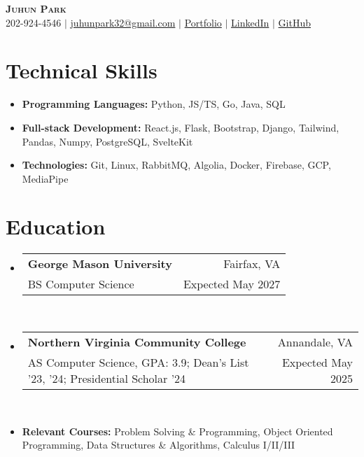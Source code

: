 \documentclass[letterpaper,11pt]{article}
\makeatletter
\newcommand{\resumeItem}[1]{
  \item\small{
    {#1 \vspace{0pt}}
  }
}
\newcommand{\resumeItemThin}[1]{
  \item\small{
    {#1 \vspace{-5pt}}
  }
}
\newcommand{\resumeSubheading}[4]{
    \item
    \begin{tabular*}{0.985\textwidth}[t]{l@{\extracolsep{\fill}}r@{\hspace{-0.1in}}}
        \small{\textbf{#1}} & \small{#2} \\
        \small#3 & \small #4 \\
    \end{tabular*}\vspace{-5pt}
}
\newcommand{\resumeSubHeadingListStart}{\begin{itemize}[leftmargin=0.00in, rightmargin=-0.2in, label={}]\vspace{1pt}}
\newcommand{\resumeSubHeadingListEnd}{\end{itemize}\vspace{-5pt}}
\newcommand{\resumeItemListStart}{\begin{itemize}[leftmargin=0.15in, rightmargin=0.15in]}
\newcommand{\resumeItemListEnd}{\end{itemize}\vspace{-10pt}}
\makeatother
\begin{document}

\begin{center}
  \textbf{\Huge \scshape {Juhun Park}} \\ \vspace{1pt}
  \small 202-924-4546 $|$
  \href{mailto:juhunpark32@gmail.com}{juhunpark32@gmail.com} $|$
  \href{https://juhun-park.vercel.app/}{Portfolio} $|$
  \href{https://linkedin.com/in/juhun-park}{LinkedIn} $|$
  \href{https://github.com/juhun32}{GitHub} \\
\end{center}

\vspace{-10pt}


\section{Technical Skills}
\vspace{3pt}
\resumeItemListStart
\resumeItemThin{\textbf{Programming Languages: }{Python, JS/TS, Go, Java, SQL}}\\
\resumeItemThin{\textbf{Full-stack Development: }{React.js, Flask, Bootstrap, Django, Tailwind, Pandas, Numpy, PostgreSQL, SvelteKit}}\\
\resumeItemThin{\textbf{Technologies: }{Git, Linux, RabbitMQ, Algolia, Docker, Firebase, GCP, MediaPipe}}\\
\resumeItemListEnd


\section{Education}
\resumeSubHeadingListStart
\resumeSubheading
{George Mason University}{Fairfax, VA}
{BS Computer Science}{Expected May 2027}\\

\resumeSubheading
{Northern Virginia Community College}{Annandale, VA}
{AS Computer Science, GPA: 3.9; Dean's List '23, '24; Presidential Scholar '24}{Expected May 2025} \\

\resumeItem{\textbf{Relevant Courses: }{Problem Solving \& Programming, Object Oriented Programming, Data Structures \& Algorithms, Calculus I/II/III}}
\resumeSubHeadingListEnd
\vspace{-3pt}

\end{document}
